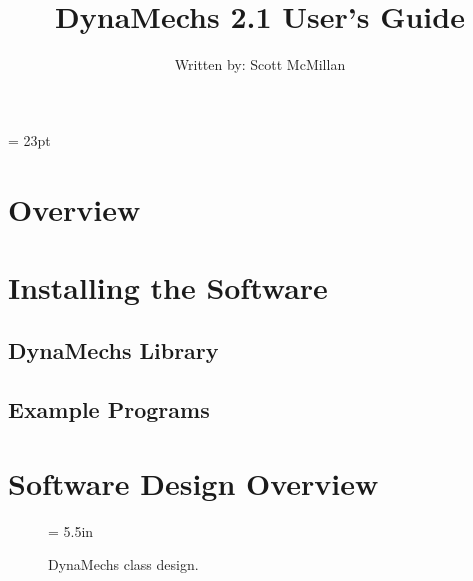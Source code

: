 \documentclass[11pt]{article}
\title{{\bf \Large DynaMechs 2.1 User's Guide}}
\author{Written by: Scott McMillan}
\begin{document}
\headsep = 23pt

\pagestyle{fancy}


\maketitle

\vfill
{}

\clearpage


\thispagestyle{fancy}

\tableofcontents

\clearpage


\section{Overview}
\cite{mcm96}


\section{Installing the Software}
\subsection{DynaMechs Library}
\subsection{Example Programs}


\section{Software Design Overview}

\begin{figure}[p]
\epsfxsize = 5.5in
\centerline{}
\caption{DynaMechs class design. \label{class_hierarchy_fig}}
\end{figure}
\end{document}
